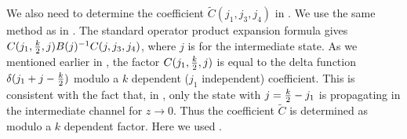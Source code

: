 We also need to determine the coefficient $\tilde{C}(j_1,j_3,j_4)$
in \fpt . We use the same method as
in  .
The standard operator product expansion formula
gives $C(j_1,{k \over 2},j)
B(j)^{-1} C(j,j_3,j_4)$, where $j$ is for the intermediate
state. As we mentioned earlier in \anotherdelta,
the factor $C(j_1, {k \over 2}, j)$ is equal
to the delta function
$ \delta(j_1+j - {k \over 2})$ modulo a $k$ dependent
($j_1$ independent) coefficient.
This is consistent with the fact that, in
\solutiontwo , only the state with
$j= {k \over 2}  - j_1  $ is propagating in the intermediate channel
for $z\to 0$. Thus
the coefficient $\tilde{C}$ is determined as
\eqn{}
modulo a $k$ dependent factor. Here we used  .


